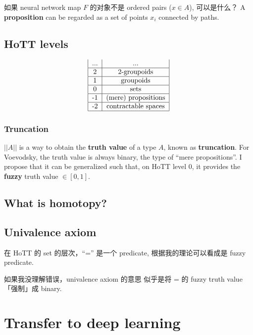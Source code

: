 如果 neural network map $F$ 的对象不是 ordered pairs ($x \in A$), 可以是什么？  A \textbf{proposition} can be regarded as a set of points $x_i$ connected by paths.  

\subsection{HoTT levels}

\begin{equation}
\begin{tabular}{|c|c|}
	... & ... \\ 
	\hline 
	2 & 2-groupoids \\ 
	\hline 
	1 & groupoids \\ 
	\hline 
	0 & sets \\ 
	\hline 
	-1 & (mere) propositions \\ 
	\hline 
	-2 & contractable spaces \\ 
	\hline 
\end{tabular} 
\end{equation}

\subsubsection{Truncation}

$||A||$ is a way to obtain the \textbf{truth value} of a type $A$, known as \textbf{truncation}.  For Voevodsky, the truth value is always binary, the type of ``mere propositions''.  I propose that it can be generalized such that, on HoTT level 0, it provides the \textbf{fuzzy} truth value $\in [0,1]$.

\subsection{What is homotopy?}

\subsection{Univalence axiom}

在 HoTT 的 set 的层次，``='' 是一个 predicate, 根据我的理论可以看成是 fuzzy predicate.

如果我没理解错误，univalence axiom 的意思 似乎是将 = 的 fuzzy truth value「强制」成 binary.

\section{Transfer to deep learning}

